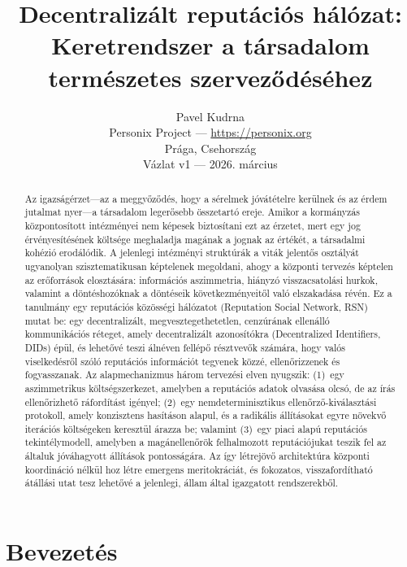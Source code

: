 \documentclass[11pt,a4paper,twocolumn]{article}
\title{\textbf{Decentralizált reputációs hálózat:\\Keretrendszer a társadalom természetes szerveződéséhez}}
\author{Pavel Kudrna\\Personix Project --- \url{https://personix.org}\\Prága, Csehország\\Vázlat v1 --- 2026. március}
\date{}
\begin{document}
\maketitle

\begin{abstract}
Az igazságérzet---az a meggyőződés, hogy a sérelmek jóvátételre kerülnek és az érdem jutalmat nyer---a társadalom legerősebb összetartó ereje. Amikor a kormányzás központosított intézményei nem képesek biztosítani ezt az érzetet, mert egy jog érvényesítésének költsége meghaladja magának a jognak az értékét, a társadalmi kohézió erodálódik. A jelenlegi intézményi struktúrák a viták jelentős osztályát ugyanolyan szisztematikusan képtelenek megoldani, ahogy a központi tervezés képtelen az erőforrások elosztására: információs aszimmetria, hiányzó visszacsatolási hurkok, valamint a döntéshozóknak a döntéseik következményeitől való elszakadása révén. Ez a tanulmány egy reputációs közösségi hálózatot (Reputation Social Network, RSN) mutat be: egy decentralizált, megvesztegethetetlen, cenzúrának ellenálló kommunikációs réteget, amely decentralizált azonosítókra (Decentralized Identifiers, DIDs) épül, és lehetővé teszi álnéven fellépő résztvevők számára, hogy valós viselkedésről szóló reputációs információt tegyenek közzé, ellenőrizzenek és fogyasszanak. Az alapmechanizmus három tervezési elven nyugszik: (1)~egy aszimmetrikus költségszerkezet, amelyben a reputációs adatok olvasása olcsó, de az írás ellenőrizhető ráfordítást igényel; (2)~egy nemdeterminisztikus ellenőrző-kiválasztási protokoll, amely konzisztens hasításon alapul, és a radikális állításokat egyre növekvő iterációs költségeken keresztül árazza be; valamint (3)~egy piaci alapú reputációs tekintélymodell, amelyben a magánellenőrök felhalmozott reputációjukat teszik fel az általuk jóváhagyott állítások pontosságára. Az így létrejövő architektúra központi koordináció nélkül hoz létre emergens meritokráciát, és fokozatos, visszafordítható átállási utat tesz lehetővé a jelenlegi, állam által igazgatott rendszerekből.
\end{abstract}

\section{Bevezetés}
\end{document}
